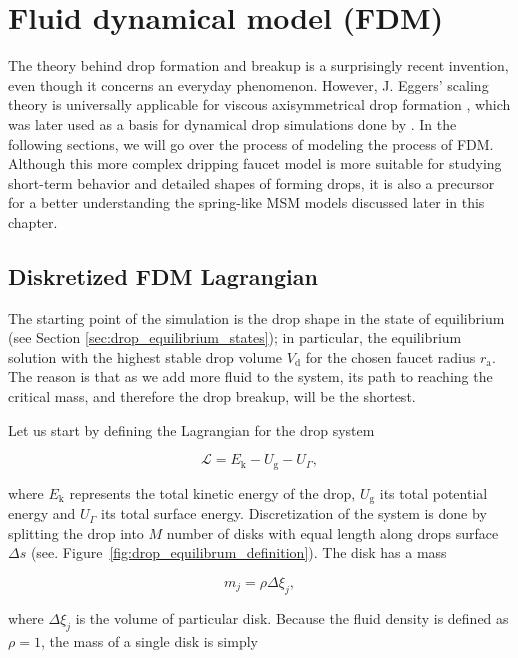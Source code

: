 \section{Fluid dynamical model (FDM)}
    The theory behind drop formation and breakup is a surprisingly recent invention, even though it concerns an everyday phenomenon. However, J. Eggers' scaling theory is universally applicable for viscous axisymmetrical drop formation \citep{eggers1993}, which was later used as a basis for dynamical drop simulations done by \citep{faucet1999}. In the following sections, we will go over the process of modeling the process of FDM. Although this more complex dripping faucet model is more suitable for studying short-term behavior and detailed shapes of forming drops, it is also a precursor for a better understanding the spring-like MSM models discussed later in this chapter.

\subsection{Diskretized FDM Lagrangian}
    The starting point of the simulation is the drop shape in the state of equilibrium (see Section \ref{sec:drop_equilibrium_states}); in particular, the equilibrium solution with the highest stable drop volume $V_{\mathrm{d}}$ for the chosen faucet radius $r_{\mathrm{a}}$. The reason is that as we add more fluid to the system, its path to reaching the critical mass, and therefore the drop breakup, will be the shortest.

    Let us start by defining the Lagrangian for the drop system
    
    \begin{equation}
        \mathcal{L} = E_{\mathrm{k}} - U_{\mathrm{g}} - U_{\Gamma},
    \end{equation}

    where $E_{\mathrm{k}}$ represents the total kinetic energy of the drop, $U_{\mathrm{g}}$ its total potential energy and $U_{\Gamma}$ its total surface energy. Discretization of the system is done by splitting the drop into $M$ number of disks with equal length along drops surface $\Delta s$ (see. Figure~\ref{fig:drop_equilibrum_definition}). The disk has a mass

    \begin{equation}
        m_j = \rho \Delta \xi_j,
    \end{equation}

    where $\Delta \xi_j$ is the volume of particular disk. Because the fluid density is defined as $\rho = 1$, the mass of a single disk is simply

